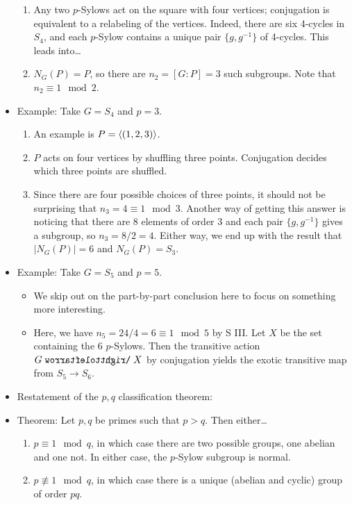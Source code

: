 \documentclass[../notes.tex]{subfiles}
\begin{document}
\begin{itemize}
\begin{enumerate}
        \item Any two $p$-Sylows act on the square with four vertices; conjugation is equivalent to a relabeling of the vertices. Indeed, there are six 4-cycles in $S_4$, and each $p$-Sylow contains a unique pair $\{g,g^{-1}\}$ of 4-cycles. This leads into\dots
        \item $N_G(P)=P$, so there are $n_2=[G:P]=3$ such subgroups. Note that $n_2\equiv 1\mod 2$.
    \end{enumerate}
    \item Example: Take $G=S_4$ and $p=3$.
    \begin{enumerate}
        \item An example is $P=\left\langle{(1,2,3)}\right\rangle$.
        \item $P$ acts on four vertices by shuffling three points. Conjugation decides which three points are shuffled.
        \item Since there are four possible choices of three points, it should not be surprising that $n_3=4\equiv 1\mod 3$. Another way of getting this answer is noticing that there are 8 elements of order 3 and each pair $\{g,g^{-1}\}$ gives a subgroup, so $n_3=8/2=4$. Either way, we end up with the result that $|N_G(P)|=6$ and $N_G(P)=S_3$.
    \end{enumerate}
    \item Example: Take $G=S_5$ and $p=5$.
    \begin{itemize}
        \item We skip out on the part-by-part conclusion here to focus on something more interesting.
        \item Here, we have $n_5=24/4=6\equiv 1\mod 5$ by S III. Let $X$ be the set containing the 6 $p$-Sylows. Then the transitive action $G\acts X$ by conjugation yields the exotic transitive map from $S_5\to S_6$.
    \end{itemize}
    \item Restatement of the $p,q$ classification theorem:
    \item Theorem: Let $p,q$ be primes such that $p>q$. Then either\dots
    \begin{enumerate}
        \item $p\equiv 1\mod q$, in which case there are two possible groups, one abelian and one not. In either case, the $p$-Sylow subgroup is normal.
        \item $p\not\equiv 1\mod q$, in which case there is a unique (abelian and cyclic) group of order $pq$.
    \end{enumerate}
\end{itemize}
\end{document}
